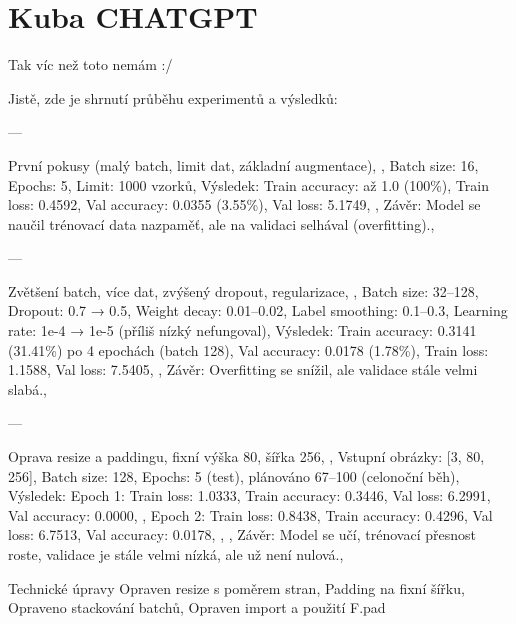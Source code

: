 \section{Kuba CHATGPT}
Tak víc než toto nemám :/ 

Jistě, zde je shrnutí průběhu experimentů a výsledků:

---

První pokusy (malý batch, limit dat, základní augmentace),
,
Batch size: 16,
Epochs: 5,
Limit: 1000 vzorků,
Výsledek:
Train accuracy: až 1.0 (100\%),
Train loss: 0.4592,
Val accuracy: 0.0355 (3.55\%),
Val loss: 5.1749,
,
Závěr: Model se naučil trénovací data nazpaměť, ale na validaci selhával (overfitting).,

---

Zvětšení batch, více dat, zvýšený dropout, regularizace,
,
Batch size: 32–128,
Dropout: 0.7 → 0.5,
Weight decay: 0.01–0.02,
Label smoothing: 0.1–0.3,
Learning rate: 1e-4 → 1e-5 (příliš nízký nefungoval),
Výsledek:
Train accuracy: 0.3141 (31.41\%) po 4 epochách (batch 128),
Val accuracy: 0.0178 (1.78\%),
Train loss: 1.1588,
Val loss: 7.5405,
,
Závěr: Overfitting se snížil, ale validace stále velmi slabá.,

---

Oprava resize a paddingu, fixní výška 80, šířka 256,
,
Vstupní obrázky: [3, 80, 256],
Batch size: 128,
Epochs: 5 (test), plánováno 67–100 (celonoční běh),
Výsledek:
Epoch 1:
Train loss: 1.0333,
Train accuracy: 0.3446,
Val loss: 6.2991,
Val accuracy: 0.0000,
,
Epoch 2:
Train loss: 0.8438,
Train accuracy: 0.4296,
Val loss: 6.7513,
Val accuracy: 0.0178,
,
,
Závěr: Model se učí, trénovací přesnost roste, validace je stále velmi nízká, ale už není nulová.,

Technické úpravy
Opraven resize s poměrem stran,
Padding na fixní šířku,
Opraveno stackování batchů,
Opraven import a použití F.pad





